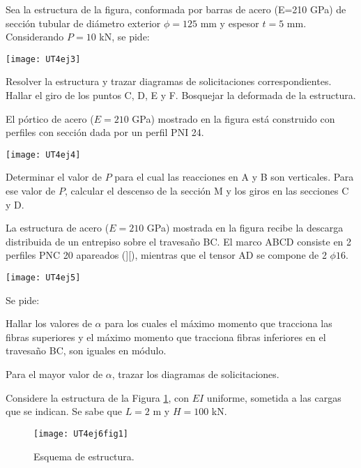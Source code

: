 \ejercicio

Sea la estructura de la figura, conformada por barras de acero (E=210 GPa) de sección tubular de diámetro exterior $\phi =125$ mm y espesor $t=5$ mm. Considerando $P=10$ kN, se pide:



\begin{center}
	\texttt{[image: UT4ej3]}
\end{center}

\parte Resolver la estructura y trazar diagramas de solicitaciones correspondientes.
\parte Hallar el giro de los puntos C, D, E y F. Bosquejar la deformada de la estructura.

\ejercicio

El pórtico de acero ($E=210$ GPa) mostrado en la figura está construido con perfiles con sección dada por un perfil PNI 24.

\begin{center}
	\texttt{[image: UT4ej4]}
\end{center}

\parte Determinar el valor de $P$  para el cual las reacciones en A y B son verticales.
\parte Para ese valor de $P$, calcular el descenso de la sección M y los giros en las secciones C y  D.

\ejercicio

La estructura de acero ($E=210$ GPa) mostrada en la figura recibe la descarga distribuida de un entrepiso sobre el travesaño BC. El marco ABCD consiste en 2 perfiles PNC 20 apareados (][), mientras que el tensor AD se compone de 2 $\phi 16$.

\begin{center}
	\texttt{[image: UT4ej5]}
\end{center}

Se pide:

\parte Hallar los valores de $\alpha$ para los cuales el máximo momento que tracciona las fibras superiores y el máximo momento que tracciona fibras inferiores en el travesaño BC, son iguales en módulo. 

\parte Para el mayor valor de $\alpha$, trazar los diagramas de solicitaciones.

\ejercicio

Considere la estructura de la Figura \ref{fig61}, con $EI$ uniforme, sometida a las cargas que se indican. Se sabe que $L=2$ m y $H= 100$ kN. %
%

\begin{figure}[htb]
	\centering
\texttt{[image: UT4ej6fig1]}
\caption{Esquema de estructura.}
\label{fig61}
\end{figure}

